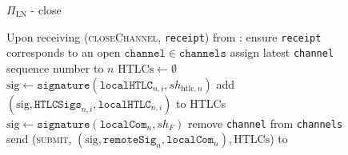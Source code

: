   \begin{figure}[H]
    \begin{protocolbox}{$\Pi_{\mathrm{LN}}$ - close}
      \begin{algorithmic}[1]
        \State Upon receiving (\textsc{closeChannel}, \texttt{receipt}) from
        \environment:
        \Indent
          \State ensure \texttt{receipt} corresponds to an open
          $\mathtt{channel} \in \mathtt{channels}$
          \State assign latest \texttt{channel} sequence number to $n$
          \State $\mathrm{HTLCs} \gets \emptyset$
            \State $\mathrm{sig} \gets
            \mathtt{signature}\left(\mathtt{localHTLC}_{n, i},
            sh_{\mathrm{htlc}, n}\right)$
            \State add $\left(\mathrm{sig}, \mathtt{HTLCSigs}_{n, i},
            \mathtt{localHTLC}_{n, i}\right)$ to HTLCs
          \EndFor
          \State $\mathrm{sig} \gets
          \mathtt{signature}\left(\mathtt{localCom}_n, sh_F\right)$
          \State remove \texttt{channel} from \texttt{channels}
          \State send (\textsc{submit}, $\left(\mathrm{sig},
          \mathtt{remoteSig}_n, \mathtt{localCom}_n\right), \mathrm{HTLCs}$) to
          \ledger
        \EndIndent
      \end{algorithmic}
    \end{protocolbox}
    \caption{}
    \label{alg:protocol:close}
  \end{figure}
